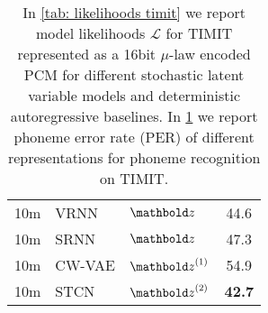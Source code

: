 \begin{table}[t]
\begin{minipage}[t]{.45\textwidth}
\begin{adjustbox}{center, totalheight=0.35\paperheight}
\begin{tabular}[t]{cll|c}
        10m    &  VRNN            & $\zb$         &   44.6   \\  %
        10m    &  SRNN            & $\zb$         &   47.3   \\  %
        10m    &  CW-VAE          & $\zb^{(1)}$   &   54.9   \\  %
        10m    &  STCN            & $\zb^{(2)}$   &   \textbf{42.7}   \\  %
\bottomrule
    \end{tabular}
    \end{adjustbox}
    \vspace{1mm}
    \caption{}
    \vspace{-1mm}
    \label{tab: phoneme recognition (PER)}
    \end{minipage}%
    \caption*{%
    In \cref{tab: likelihoods timit} we report model likelihoods $\mathcal{L}$ for TIMIT represented as a 16bit $\mu$-law encoded PCM for different stochastic latent variable models and deterministic autoregressive baselines. 
    In \cref{tab: phoneme recognition (PER)} we report phoneme error rate (PER) of different representations for phoneme recognition on TIMIT. 
    }
\end{table}
%

